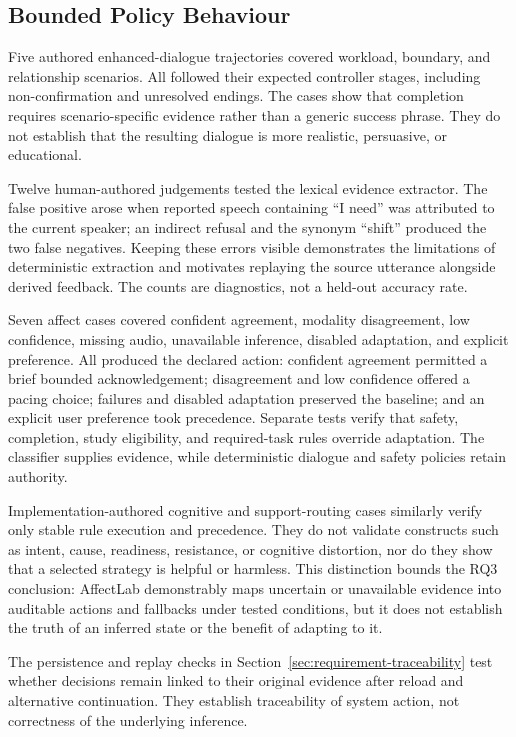 \subsection{Bounded Policy Behaviour}
\label{subsec:policy-case-results}

Five authored enhanced-dialogue trajectories covered workload, boundary, and relationship scenarios. All followed their expected controller stages, including non-confirmation and unresolved endings. The cases show that completion requires scenario-specific evidence rather than a generic success phrase. They do not establish that the resulting dialogue is more realistic, persuasive, or educational.

Twelve human-authored judgements tested the lexical evidence extractor. The false positive arose when reported speech containing ``I need'' was attributed to the current speaker; an indirect refusal and the synonym ``shift'' produced the two false negatives. Keeping these errors visible demonstrates the limitations of deterministic extraction and motivates replaying the source utterance alongside derived feedback. The counts are diagnostics, not a held-out accuracy rate.

Seven affect cases covered confident agreement, modality disagreement, low confidence, missing audio, unavailable inference, disabled adaptation, and explicit preference. All produced the declared action: confident agreement permitted a brief bounded acknowledgement; disagreement and low confidence offered a pacing choice; failures and disabled adaptation preserved the baseline; and an explicit user preference took precedence. Separate tests verify that safety, completion, study eligibility, and required-task rules override adaptation. The classifier supplies evidence, while deterministic dialogue and safety policies retain authority.

Implementation-authored cognitive and support-routing cases similarly verify only stable rule execution and precedence. They do not validate constructs such as intent, cause, readiness, resistance, or cognitive distortion, nor do they show that a selected strategy is helpful or harmless. This distinction bounds the RQ3 conclusion: AffectLab demonstrably maps uncertain or unavailable evidence into auditable actions and fallbacks under tested conditions, but it does not establish the truth of an inferred state or the benefit of adapting to it.

The persistence and replay checks in Section~\ref{sec:requirement-traceability} test whether decisions remain linked to their original evidence after reload and alternative continuation. They establish traceability of system action, not correctness of the underlying inference.

